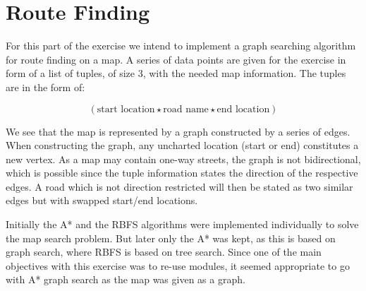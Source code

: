 \section{Route Finding}

For this part of the exercise we intend to implement a graph searching algorithm for route finding on a map. A series of data points are given for the exercise in form of a list of tuples, of size 3, with the needed map information. The tuples are in the form of:

\begin{equation} \label{eq:maptuple}
    (\text{start location} \star \text{road name} \star \text{end location})
\end{equation}
    
We see that the map is represented by a graph constructed by a series of edges. When constructing the graph, any uncharted location (start or end) constitutes a new vertex. As a map may contain one-way streets, the graph is not bidirectional, which is possible since the tuple information states the direction of the respective edges. A road which is not direction restricted will then be stated as two similar edges but with swapped start/end locations.

Initially the A* and the RBFS algorithms were implemented individually to solve the map search problem. But later only the A* was kept, as this is based on graph search, where RBFS is based on tree search. Since one of the main objectives with this exercise was to re-use modules, it seemed appropriate to go with A* graph search as the map was given as a graph. 

